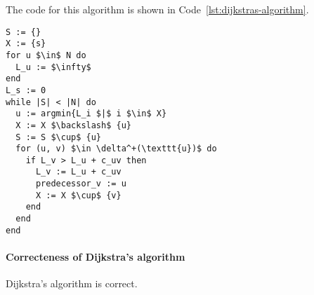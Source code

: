 \documentclass[english]{article}
\begin{document}
\bigskip
The code for this algorithm is shown in Code~\ref{lst:dijkstras-algorithm}.

\begin{lstlisting}[caption={Dijkstra's algorithm}, label={lst:dijkstras-algorithm}, float]
S := {}
X := {s}
for u $\in$ N do
  L_u := $\infty$
end
L_s := 0
while |S| < |N| do
  u := argmin{L_i $|$ i $\in$ X}
  X := X $\backslash$ {u}
  S := S $\cup$ {u}
  for (u, v) $\in \delta^+(\texttt{u})$ do
    if L_v > L_u + c_uv then
      L_v := L_u + c_uv
      predecessor_v := u
      X := X $\cup$ {v}
    end
  end
end
\end{lstlisting}

\paragraph{Correcteness of Dijkstra's algorithm}

\begin{proposition}
  Dijkstra's algorithm is correct.
\end{proposition}
\end{document}
